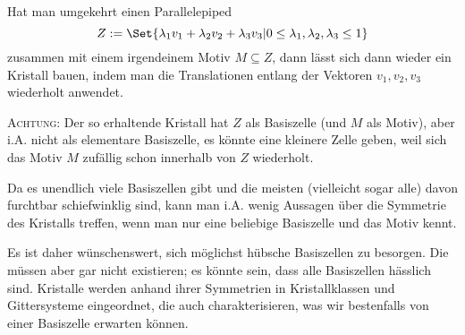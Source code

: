 \begin{remark}
Hat man umgekehrt einen Parallelepiped
\[Z:=\Set{\lambda_1v_1+\lambda_2v_2+\lambda_3v_3 | 0\leq\lambda_1,\lambda_2,\lambda_3\leq 1}\]
zusammen mit einem irgendeinem Motiv $M\subseteq Z$, dann lässt sich dann wieder ein Kristall bauen, indem man die Translationen entlang der Vektoren $v_1,v_2,v_3$ wiederholt anwendet.

\textsc{Achtung}: Der so erhaltende Kristall hat $Z$ als Basiszelle (und $M$ als Motiv), aber i.A. nicht als elementare Basiszelle, es könnte eine kleinere Zelle geben, weil sich das Motiv $M$ zufällig schon innerhalb von $Z$ wiederholt.
\end{remark}

\begin{remark}
Da es unendlich viele Basiszellen gibt und die meisten (vielleicht sogar alle) davon furchtbar schiefwinklig sind, kann man i.A. wenig Aussagen über die Symmetrie des Kristalls treffen, wenn man nur eine beliebige Basiszelle und das Motiv kennt.

Es ist daher wünschenswert, sich möglichst hübsche Basiszellen zu besorgen. Die müssen aber gar nicht existieren; es könnte sein, dass alle Basiszellen hässlich sind. Kristalle werden anhand ihrer Symmetrien in Kristallklassen und Gittersysteme eingeordnet, die auch charakterisieren, was wir bestenfalls von einer Basiszelle erwarten können.
\end{remark}

